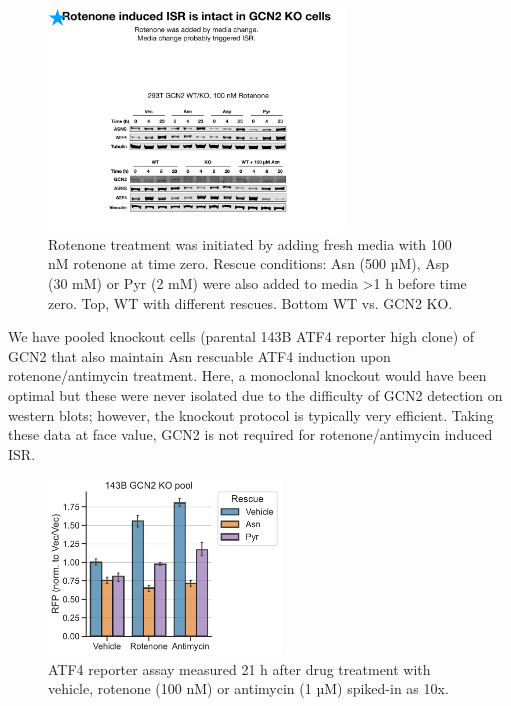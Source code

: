 \begin{figure}[ht]
    \centering
    \includegraphics[width=0.70\textwidth]{figures/sapp/ISR/293T_GCN2_ISR.pdf}
    \caption[ATF4 post mito inhib. GCN2 KO, western]{
    Rotenone treatment was initiated by adding fresh media with 100 nM rotenone at time zero.
    Rescue conditions: Asn (500 µM), Asp (30 mM) or Pyr (2 mM) were also added to media >1 h before time zero.
    Top, WT with different rescues.
    Bottom WT vs. GCN2 KO.
    }
    \label{fig:sapp:ISR:293T_GCN2_ISR}
\end{figure}


\FloatBarrier
We have pooled knockout cells (parental 143B ATF4 reporter high clone) of GCN2 that also maintain Asn rescuable ATF4 induction upon rotenone/antimycin treatment.
Here, a monoclonal knockout would have been optimal but these were never isolated due to the difficulty of GCN2 detection on western blots; however, the knockout protocol is typically very efficient.
Taking these data at face value, GCN2 is not required for rotenone/antimycin induced ISR.

\begin{figure}[ht]
    \centering
    \includegraphics[width=0.55\textwidth]{figures/sapp/ISR/143B_GCN2_ISR.pdf}
    \caption[ATF4 post mito inhib. GCN2 KO, reporter]{
    ATF4 reporter assay measured 21 h after drug treatment with vehicle, rotenone (100 nM) or antimycin (1 µM) spiked-in as 10x.
    }
    \label{fig:sapp:ISR:143B_GCN2_ISR}
\end{figure}






